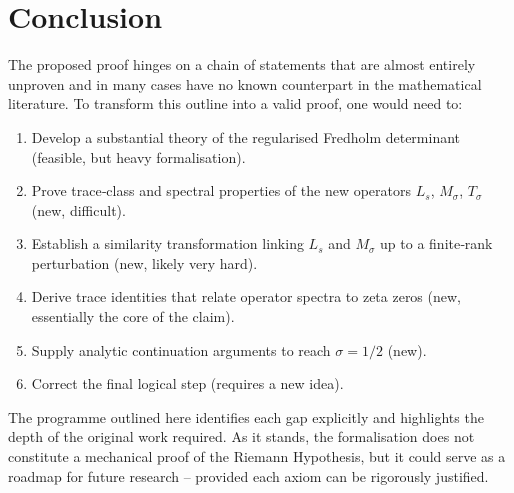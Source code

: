 \documentclass{article}
\begin{document}
\section{Conclusion}
The proposed proof hinges on a chain of statements that are almost entirely unproven and in many cases have no known counterpart in the mathematical literature.  To transform this outline into a valid proof, one would need to:
\begin{enumerate}
  \item Develop a substantial theory of the regularised Fredholm determinant (feasible, but heavy formalisation).
  \item Prove trace‑class and spectral properties of the new operators $L_s$, $M_\sigma$, $T_\sigma$ (new, difficult).
  \item Establish a similarity transformation linking $L_s$ and $M_\sigma$ up to a finite‑rank perturbation (new, likely very hard).
  \item Derive trace identities that relate operator spectra to zeta zeros (new, essentially the core of the claim).
  \item Supply analytic continuation arguments to reach $\sigma = 1/2$ (new).
  \item Correct the final logical step (requires a new idea).
\end{enumerate}
The programme outlined here identifies each gap explicitly and highlights the depth of the original work required.  As it stands, the formalisation does not constitute a mechanical proof of the Riemann Hypothesis, but it could serve as a roadmap for future research – provided each axiom can be rigorously justified.
\end{document}
